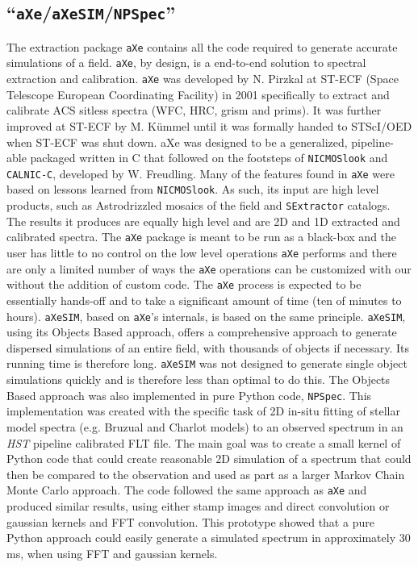 \documentclass[preprint]{aastex}
\begin{document}
\subsection{``\texttt{aXe}/\texttt{aXeSIM}/\texttt{NPSpec}''} \label{sec:npspec}
The extraction package \texttt{aXe} contains all the code required to generate accurate simulations of a field. \texttt{aXe}, by design, is a end-to-end solution to spectral extraction and calibration. 
\texttt{aXe} was developed by N. Pirzkal at ST-ECF (Space Telescope European Coordinating Facility) in 2001 specifically to extract and calibrate ACS sitless spectra (WFC, HRC, grism and prims). It was further improved at ST-ECF by M. K\"{u}mmel until it was formally handed to STScI/OED  when ST-ECF was shut down. aXe was designed to be a generalized, pipeline-able packaged written in C that followed on the footsteps of \texttt{NICMOSlook} and \texttt{CALNIC-C}, developed by W. Freudling. Many of the features found in \texttt{aXe} were based on lessons learned from \texttt{NICMOSlook}.
As such, its input are high level products, such as Astrodrizzled mosaics of the field and \texttt{SExtractor} catalogs. The results it produces are equally high level and are 2D and 1D extracted and calibrated spectra. The \texttt{aXe} package is meant to be run as a black-box and the user has little to no control on the low level operations \texttt{aXe} performs and there are only a limited number of ways the \texttt{aXe} operations can be customized with our without the addition of custom code. The \texttt{aXe} process is expected to be essentially hands-off and to take a significant amount of time (ten of minutes to hours).  \texttt{aXeSIM}, based on \texttt{aXe}'s internals, is based on the same principle. \texttt{aXeSIM}, using its Objects Based approach, offers a comprehensive approach to generate dispersed simulations of an entire field, with thousands of objects if necessary. Its running time is therefore long. \texttt{aXeSIM} was not designed to generate single object simulations quickly and is therefore less than optimal to do this.
The Objects Based approach was also implemented in pure Python code, \texttt{NPSpec}. This implementation was created with the specific task of 2D in-situ fitting of stellar model spectra (e.g. Bruzual and Charlot models) to an observed spectrum in an \textit{HST} pipeline calibrated FLT file. The main goal was to create a small kernel of Python code that could create reasonable 2D simulation of a spectrum that could then be compared to the observation and used as part as a larger Markov Chain Monte Carlo approach. The code followed the same approach as \texttt{aXe} and produced similar results, using either stamp images and direct convolution or gaussian kernels and FFT convolution. This prototype showed that a pure Python approach could easily generate a simulated spectrum in approximately 30 ms, when using FFT and gaussian kernels.
\end{document}
